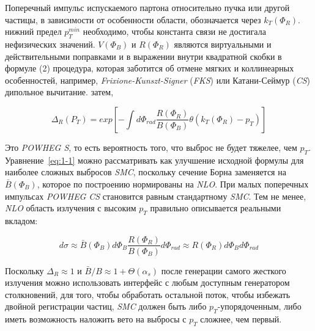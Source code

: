 Поперечный импульс испускаемого партона относительно
пучка или другой частицы, в зависимости от особенности области, обозначается через ${k}_{T}({\Phi}_{R})$.
нижний предел ${p}_{T}^{min}$
необходимо, чтобы константа связи не достигала нефизических значений.
$V({\Phi}_{B})$ и $R({\Phi}_{R})$ являются виртуальными и действительными поправками и в выражении внутри
квадратной скобки в формуле (2) процедура, которая заботится об отмене мягких и коллинеарных
особенностей, например, \textit{Frixione-Kunszt-Signer} (\textit{FKS}) или Катани-Сеймур (\textit{CS})
дипольное вычитание. затем,

\begin{equation} \label{eq:1-2}  
	{\Delta}_{R}({P}_{T}) = exp[-\int d{\Phi}_{rad}\frac{R({\Phi}_{R})}{B({\Phi}_{B})}\theta({k}_{T}({\Phi}_{R}) - {p}_{T})]
\end{equation}

Это \textit{POWHEG S}, то есть вероятность того, что выброс не будет тяжелее, чем ${p}_{T}$. Уравнение~\ref{eq:1-1} можно рассматривать как улучшение исходной формулы для наиболее сложных выбросов \textit{SMC}, поскольку
сечение Борна заменяется на $\bar{B}({\Phi}_{B})$, которое по построению нормированы на \textit{NLO}.
При малых поперечных импульсах \textit{POWHEG} \textit{CS} становится равным стандартному \textit{SMC}.
Тем не менее, \textit{NLO}
область излучения с высоким ${p}_{T}$ правильно описывается реальными вкладом:

\begin{equation} \label{eq:1-3}   
	d\sigma \approx \bar{B}({\Phi}_{B}) d{\Phi}_{B}\frac{R({\Phi}_{R})}{B({\Phi}_{B})}d{\Phi}_{rad}\approx R({\Phi}_{R})d{\Phi}_{B}d{\Phi}_{rad}
\end{equation}


Поскольку ${\Delta}_{R} \approx 1$ и $\bar{B}/B \approx 1 + \Theta ({\alpha}_{s})$ после генерации самого жесткого излучения можно
использовать интерфейс с любым доступным генератором столкновений, для того, чтобы обработать остальной поток,
чтобы избежать двойной регистрации частиц, \textit{SMC} должен быть либо ${p}_{T}$-упорядоченным, либо иметь возможность
наложить вето на выбросы с ${p}_{T}$ сложнее, чем первый.

